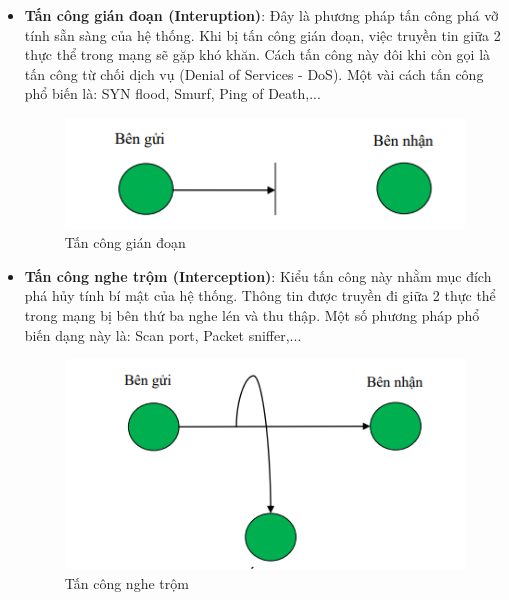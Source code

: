 \begin{itemize}
    \item \textbf{Tấn công gián đoạn (Interuption)}: Đây là phương pháp tấn công phá vỡ tính sẵn sàng của hệ thống. Khi bị tấn công gián đoạn, việc truyền tin giữa 2 thực thể trong mạng sẽ gặp khó khăn. Cách tấn công này đôi khi còn gọi là tấn công từ chối dịch vụ (Denial of Services - DoS). Một vài cách tấn công phổ biến là: SYN flood, Smurf, Ping of Death,...
    \begin{figure}[H]
        \centering
        \includegraphics{interuption}
        \caption{Tấn công gián đoạn}
         
    \end{figure}
    \item \textbf{Tấn công nghe trộm (Interception)}: Kiểu tấn công này nhằm mục đích phá hủy tính bí mật của hệ thống. Thông tin được truyền đi giữa 2 thực thể trong mạng bị bên thứ ba nghe lén và thu thập. Một số phương pháp phổ biến dạng này là: Scan port, Packet sniffer,...
    \begin{figure}[H]
        \centering
        \includegraphics{interception}
        \caption{Tấn công nghe trộm}
         

\end{figure}
\end{itemize}
